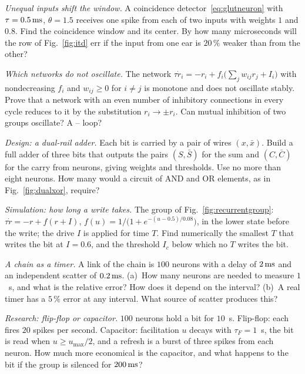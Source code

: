 \begin{exercise}[\lvlB]
\label{ex:02:2}
\emph{Unequal inputs shift the window.} A coincidence detector~\eqref{eq:glutneuron} with $\tau=0.5\,\text{ms}$, $\theta=1.5$ receives one spike from each of two inputs with weights $1$ and $0.8$. Find the coincidence window and its center. By how many microseconds will the row of Fig.~\ref{fig:itd} err if the input from one ear is $20\,\%$ weaker than from the other?
\end{exercise}

\begin{exercise}[\lvlB]
\label{ex:02:3}
\emph{Which networks do not oscillate.} The network $\tau\dot r_i=-r_i+f_i\bigl(\textstyle\sum_jw_{ij}r_j+I_i\bigr)$ with nondecreasing $f_i$ and $w_{ij}\ge0$ for $i\ne j$ is monotone and does not oscillate stably. Prove that a network with an even number of inhibitory connections in every cycle reduces to it by the substitution $r_i\to\pm r_i$. Can mutual inhibition of two groups oscillate? A -- loop?
\end{exercise}

\begin{exercise}[\lvlB]
\label{ex:02:4}
\emph{Design: a dual-rail adder.} Each bit is carried by a pair of wires $(x,\bar x)$. Build a full adder of three bits that outputs the pairs $(S,\bar S)$ for the sum and $(C,\bar C)$ for the carry from  neurons, giving weights and thresholds. Use no more than eight neurons. How many would a circuit of AND and OR elements, as in Fig.~\ref{fig:dualxor}, require?
\end{exercise}

\begin{exercise}[\lvlB]
\label{ex:02:5}
\emph{Simulation: how long a write takes.} The group of Fig.~\ref{fig:recurrentgroup}: $\tau\dot r=-r+f(r+I)$, $f(u)=1/\bigl(1+e^{-(u-0.5)/0.08}\bigr)$, in the lower state before the write; the drive $I$ is applied for time $T$. Find numerically the smallest $T$ that writes the bit at $I=0.6$, and the threshold $I_c$ below which no $T$ writes the bit.
\end{exercise}

\begin{exercise}[\lvlA]
\label{ex:02:6}
\emph{A chain as a timer.} A link of the chain is $100$  neurons with a delay of $2\,\text{ms}$ and an independent scatter of $0.2\,\text{ms}$. (a)~How many neurons are needed to measure $1$~s, and what is the relative error? How does it depend on the interval? (b)~A real timer has a $5\,\%$ error at any interval. What source of scatter produces this?
\end{exercise}

\begin{exercise}[\lvlC]
\label{ex:02:7}
\emph{Research: flip-flop or capacitor.} $100$ neurons hold a bit for $10$~s. Flip-flop: each fires $20$ spikes per second. Capacitor: facilitation $u$ decays with $\tau_F=1$~s, the bit is read when $u\ge u_{\max}/2$, and a refresh is a burst of three spikes from each neuron. How much more economical is the capacitor, and what happens to the bit if the group is silenced for $200\,\text{ms}$?
\end{exercise}
